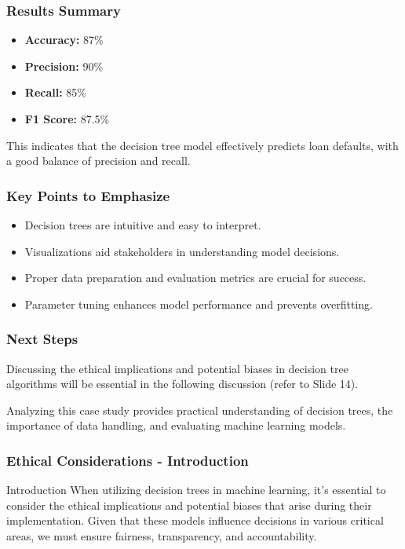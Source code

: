\documentclass[aspectratio=169]{beamer}
\begin{document}
\begin{frame}[fragile]
    \frametitle{Results Summary}
    \begin{itemize}
        \item \textbf{Accuracy:} 87\%
        \item \textbf{Precision:} 90\%
        \item \textbf{Recall:} 85\%
        \item \textbf{F1 Score:} 87.5\%
    \end{itemize}
    This indicates that the decision tree model effectively predicts loan defaults, with a good balance of precision and recall.
\end{frame}

\begin{frame}[fragile]
    \frametitle{Key Points to Emphasize}
    \begin{itemize}
        \item Decision trees are intuitive and easy to interpret.
        \item Visualizations aid stakeholders in understanding model decisions.
        \item Proper data preparation and evaluation metrics are crucial for success.
        \item Parameter tuning enhances model performance and prevents overfitting.
    \end{itemize}
\end{frame}

\begin{frame}[fragile]
    \frametitle{Next Steps}
    Discussing the ethical implications and potential biases in decision tree algorithms will be essential in the following discussion (refer to Slide 14).
    
    Analyzing this case study provides practical understanding of decision trees, the importance of data handling, and evaluating machine learning models.
\end{frame}

\begin{frame}[fragile]
    \frametitle{Ethical Considerations - Introduction}
    \begin{block}{Introduction}
        When utilizing decision trees in machine learning, it's essential to consider the ethical implications and potential biases that arise during their implementation. 
        Given that these models influence decisions in various critical areas, we must ensure fairness, transparency, and accountability.
    \end{block}
\end{frame}
\end{document}
